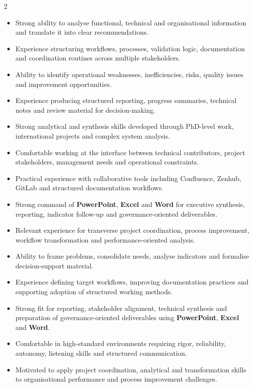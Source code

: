 \documentclass[8pt,a4paper,ragged2e,withhyper]{altacv}
\begin{document}
\begin{paracol}{2}
\begin{itemize}
  \item Strong ability to analyse functional, technical and organisational information and translate it into clear recommendations.
  \item Experience structuring workflows, processes, validation logic, documentation and coordination routines across multiple stakeholders.
  \item Ability to identify operational weaknesses, inefficiencies, risks, quality issues and improvement opportunities.
  \item Experience producing structured reporting, progress summaries, technical notes and review material for decision-making.
  \item Strong analytical and synthesis skills developed through PhD-level work, international projects and complex system analysis.
  \item Comfortable working at the interface between technical contributors, project stakeholders, management needs and operational constraints.
  \item Practical experience with collaborative tools including Confluence, Zenhub, GitLab and structured documentation workflows.
  \item Strong command of \textbf{PowerPoint}, \textbf{Excel} and \textbf{Word} for executive synthesis, reporting, indicator follow-up and governance-oriented deliverables.
\end{itemize}


\begin{itemize}
  \item Relevant experience for transverse project coordination, process improvement, workflow transformation and performance-oriented analysis.
  \item Ability to frame problems, consolidate needs, analyse indicators and formalise decision-support material.
  \item Experience defining target workflows, improving documentation practices and supporting adoption of structured working methods.
  \item Strong fit for reporting, stakeholder alignment, technical synthesis and preparation of governance-oriented deliverables using \textbf{PowerPoint}, \textbf{Excel} and \textbf{Word}.
  \item Comfortable in high-standard environments requiring rigor, reliability, autonomy, listening skills and structured communication.
  \item Motivated to apply project coordination, analytical and transformation skills to organisational performance and process improvement challenges.
\end{itemize}


\end{paracol}
\end{document}
